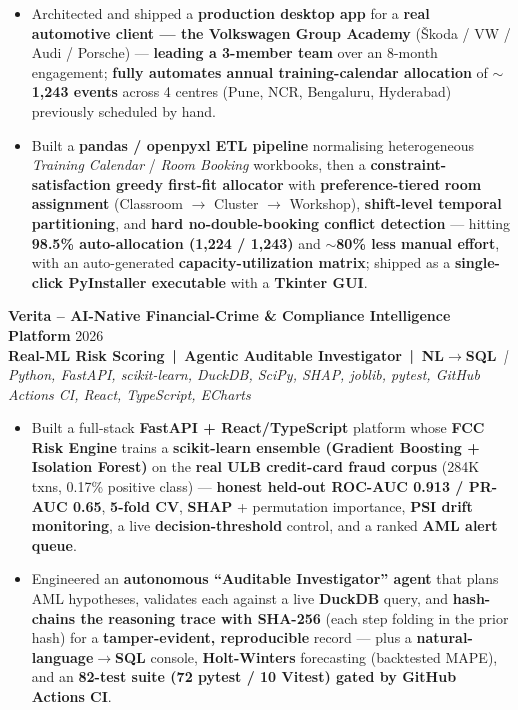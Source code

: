 \documentclass[a4paper,10pt]{article}
\newcommand{\projectEntry}[4]{%
  \vspace{1pt}%
  \noindent\textbf{\color{HeaderDark}#1} \hfill {\small\color{SubText}#2}\\[-4pt]%
  {\scriptsize\color{AccentTeal}\textbf{#3}} {\scriptsize\color{TechTag}\textit{\,|\, #4}}%
  \vspace{0pt}\par%
}
\begin{document}
\begin{itemize}[leftmargin=14pt, itemsep=0pt, parsep=0pt, topsep=1pt, label={\color{BulletColor}\textbf{--}}]
  \item {\small Architected and shipped a \textbf{production desktop app} for a \textbf{real automotive client --- the Volkswagen Group Academy} (\v{S}koda / VW / Audi / Porsche) --- \textbf{leading a 3-member team} over an 8-month engagement; \textbf{fully automates annual training-calendar allocation} of \textbf{$\sim$1,243 events} across 4 centres (Pune, NCR, Bengaluru, Hyderabad) previously scheduled by hand.}
  \item {\small Built a \textbf{pandas / openpyxl ETL pipeline} normalising heterogeneous \textit{Training Calendar} / \textit{Room Booking} workbooks, then a \textbf{constraint-satisfaction greedy first-fit allocator} with \textbf{preference-tiered room assignment} (Classroom $\rightarrow$ Cluster $\rightarrow$ Workshop), \textbf{shift-level temporal partitioning}, and \textbf{hard no-double-booking conflict detection} --- hitting \textbf{98.5\% auto-allocation (1,224 / 1,243)} and \textbf{$\sim$80\% less manual effort}, with an auto-generated \textbf{capacity-utilization matrix}; shipped as a \textbf{single-click PyInstaller executable} with a \textbf{Tkinter GUI}.}
\end{itemize}

\vspace{1pt}

\projectEntry{Verita -- AI-Native Financial-Crime \& Compliance Intelligence Platform}
  {2026}
  {Real-ML Risk Scoring \,|\, Agentic Auditable Investigator \,|\, NL$\rightarrow$SQL}
  {Python, FastAPI, scikit-learn, DuckDB, SciPy, SHAP, joblib, pytest, GitHub Actions CI, React, TypeScript, ECharts}

\begin{itemize}[leftmargin=14pt, itemsep=0pt, parsep=0pt, topsep=1pt, label={\color{BulletColor}\textbf{--}}]
  \item {\small Built a full-stack \textbf{FastAPI + React/TypeScript} platform whose \textbf{FCC Risk Engine} trains a \textbf{scikit-learn ensemble (Gradient Boosting + Isolation Forest)} on the \textbf{real ULB credit-card fraud corpus} (284K txns, 0.17\% positive class) --- \textbf{honest held-out ROC-AUC 0.913 / PR-AUC 0.65}, \textbf{5-fold CV}, \textbf{SHAP} + permutation importance, \textbf{PSI drift monitoring}, a live \textbf{decision-threshold} control, and a ranked \textbf{AML alert queue}.}
  \item {\small Engineered an \textbf{autonomous ``Auditable Investigator'' agent} that plans AML hypotheses, validates each against a live \textbf{DuckDB} query, and \textbf{hash-chains the reasoning trace with SHA-256} (each step folding in the prior hash) for a \textbf{tamper-evident, reproducible} record --- plus a \textbf{natural-language$\rightarrow$SQL} console, \textbf{Holt-Winters} forecasting (backtested MAPE), and an \textbf{82-test suite (72 pytest / 10 Vitest) gated by GitHub Actions CI}.}
\end{itemize}
\end{document}
